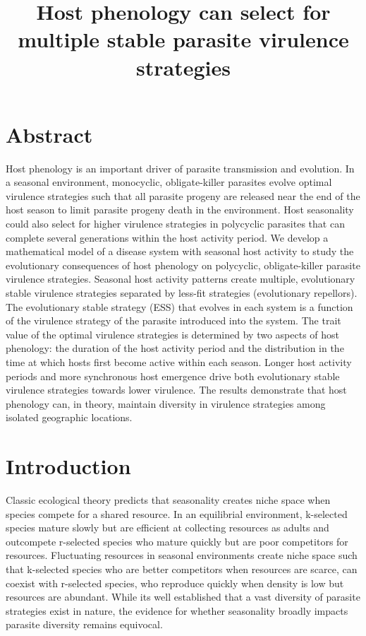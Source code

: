 \documentclass{article}
\title{Host phenology can select for multiple stable parasite virulence strategies}
\date{}
\begin{document}
\maketitle

\section*{Abstract}
Host phenology is an important driver of parasite transmission and evolution. In a seasonal environment, monocyclic, obligate-killer parasites evolve optimal virulence strategies such that all parasite progeny are released near the end of the host season to limit parasite progeny death in the environment. Host seasonality could also select for higher virulence strategies in polycyclic parasites that can complete several generations within the host activity period. We develop a mathematical model of a disease system with seasonal host activity to study the evolutionary consequences of host phenology on polycyclic, obligate-killer parasite virulence strategies. Seasonal host activity patterns create multiple, evolutionary stable virulence strategies separated by less-fit strategies (evolutionary repellors). The evolutionary stable strategy (ESS) that evolves in each system is a function of the virulence strategy of the parasite introduced into the system. The trait value of the optimal virulence strategies is determined by two aspects of host phenology: the duration of the host activity period and the distribution in the time at which hosts first become active within each season. Longer host activity periods and more synchronous host emergence drive both evolutionary stable virulence strategies towards lower virulence. The results demonstrate that host phenology can, in theory, maintain diversity in virulence strategies among isolated geographic locations.




\section*{Introduction}
Classic ecological theory predicts that seasonality creates niche space when species compete for a shared resource. In an equilibrial environment, k-selected species mature slowly but are efficient at collecting resources as adults and outcompete r-selected species who mature quickly but are poor competitors for resources\cite{tilman2020resource}. Fluctuating resources in seasonal environments create niche space such that k-selected species who are better competitors when resources are scarce, can coexist with r-selected species, who reproduce quickly when density is low but resources are abundant\cite{koch1974competitive,armstrong1980competitive,litchman2001competition,klausmeier2008floquet}. While its well established that a vast diversity of parasite strategies exist in nature, the evidence for whether seasonality broadly impacts parasite diversity remains equivocal.
\end{document}
